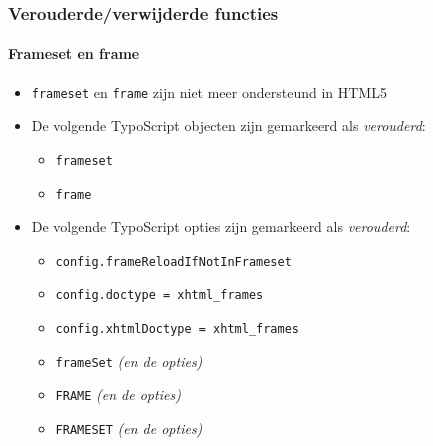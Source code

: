 \begin{frame}[fragile]
	\frametitle{Verouderde/verwijderde functies}
	\framesubtitle{Frameset en frame}

	\begin{itemize}
		\item \texttt{frameset} en \texttt{frame} zijn niet meer ondersteund in HTML5
		\item De volgende TypoScript objecten zijn gemarkeerd als \textit{verouderd}:

			\begin{itemize}
				\item \texttt{frameset}
				\item \texttt{frame}
			\end{itemize}

		\item De volgende TypoScript opties zijn gemarkeerd als \textit{verouderd}:

			\begin{itemize}
				\item \texttt{config.frameReloadIfNotInFrameset}
				\item \texttt{config.doctype = xhtml\_frames}
				\item \texttt{config.xhtmlDoctype = xhtml\_frames}
				\item \texttt{frameSet} \tabto{1.8cm}\textit{(en de opties)}
				\item \texttt{FRAME} \tabto{1.8cm}\textit{(en de opties)}
				\item \texttt{FRAMESET} \tabto{1.8cm}\textit{(en de opties)}
			\end{itemize}

	\end{itemize}

\end{frame}





